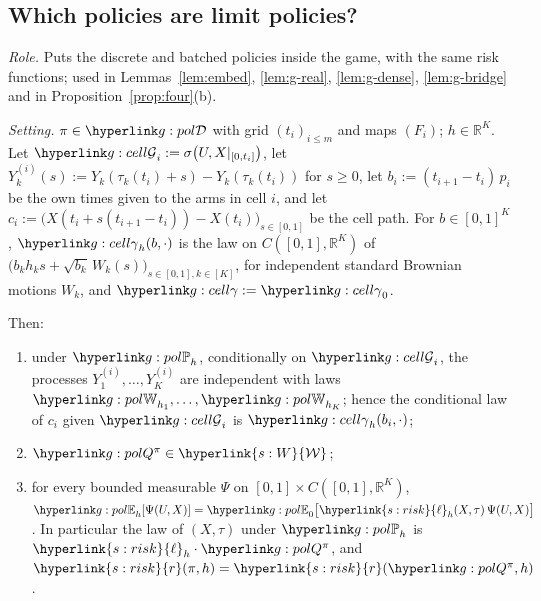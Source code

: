 \documentclass[11pt]{article}
\newcommand{\dt}[1]{\hypertarget{#1}{}}
\DeclareRobustCommand{\sy}[2]{{\hyperlink{#1}{#2}}}
\newcommand{\R}{\mathbb{R}}
\newcommand{\1}{\mathbf{1}}
\newcommand{\Wc}{\sy{s:W}{\mathcal W}}
\newcommand{\rk}{\sy{s:risk}{r}}
\newcommand{\lh}{\sy{s:risk}{\ell}}
\begin{document}
\subsection{Which policies are limit policies?}\label{sec:app-g-which}

\begin{lemma}\label{lem:g-disc}
\textit{Role.} Puts the discrete and batched policies inside the game, with the same risk functions; used in Lemmas~\ref{lem:embed}, \ref{lem:g-real},
\ref{lem:g-dense}, \ref{lem:g-bridge} and in Proposition~\ref{prop:four}(b).

\noindent\textit{Setting.}\dt{g:cell} $\pi\in\gDc$ with grid $(t_i)_{i\le m}$ and maps $(F_i)$; $h\in\R^K$. Let $\gG_i:=\sigma\big(U,X|_{[0,t_i]}\big)$, let
$Y^{(i)}_k(s):=Y_k(\tau_k(t_i)+s)-Y_k(\tau_k(t_i))$ for $s\ge0$, let $b_i:=(t_{i+1}-t_i)\,p_i$ be the own times given to the arms in cell $i$, and let
$c_i:=\big(X(t_i+s(t_{i+1}-t_i))-X(t_i)\big)_{s\in[0,1]}$ be the cell path. For $b\in[0,1]^K$, $\ggam_h(b,\cdot)$ is the law on $C([0,1],\R^K)$ of
$\big(b_kh_ks+\sqrt{b_k}\,W_k(s)\big)_{s\in[0,1],k\in[K]}$, for independent standard Brownian motions $W_k$, and $\ggam:=\ggam_0$.

\noindent Then:
\begin{enumerate}
\item[(a)] under $\gPh_h$, conditionally on $\gG_i$, the processes $Y^{(i)}_1,\dots,Y^{(i)}_K$ are independent with laws $\gWi_{h_1},\dots,\gWi_{h_K}$; hence the conditional law of
$c_i$ given $\gG_i$ is $\ggam_h(b_i,\cdot)$;
\item[(b)] $\gQp\pi\in\Wc$;
\item[(c)] for every bounded measurable $\Psi$ on $[0,1]\times C([0,1],\R^K)$, $\gEh_h[\Psi(U,X)]=\gEh_0\big[\lh_h(X,\tau)\,\Psi(U,X)\big]$. In particular the law of $(X,\tau)$
under $\gPh_h$ is $\lh_h\cdot\gQp\pi$, and $\rk(\pi,h)=\rk(\gQp\pi,h)$.
\end{enumerate}
\end{lemma}
\end{document}
